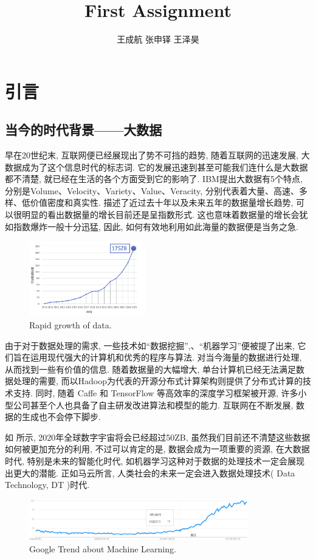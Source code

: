 \documentclass[lang=cn,11pt,a4paper]{elegantpaper}
\title{First Assignment}
\author{王成航 张申铎 王泽昊}
\begin{document}

\newpage
\tableofcontents
\thispagestyle{empty}
\newpage
{}
\section{引言}
\subsection{当今的时代背景——大数据}
\par 早在20世纪末, 互联网便已经展现出了势不可挡的趋势, 随着互联网的迅速发展, 大数据成为了这个信息时代的标志词. 它的发展迅速到甚至可能我们连什么是大数据都不清楚, 就已经在生活的各个方面受到它的影响了. IBM提出大数据有5个特点, 分别是Volume、Velocity、Variety、Value、Veracity, 分别代表着大量、高速、多样、低价值密度和真实性.  描述了近过去十年以及未来五年的数据量增长趋势, 可以很明显的看出数据量的增长目前还是呈指数形式. 这也意味着数据量的增长会犹如指数爆炸一般十分迅猛, 因此, 如何有效地利用如此海量的数据便是当务之急. 
\begin{figure}[htbp]
	\centering
	\includegraphics[width=0.45\textwidth]{Bigdata}
  	\caption{Rapid growth of data.\label{fig:data}}
\end{figure}
\par 由于对于数据处理的需求, 一些技术如“数据挖掘”,、“机器学习”便被提了出来, 它们旨在运用现代强大的计算机和优秀的程序与算法. 对当今海量的数据进行处理, 从而找到一些有价值的信息. 随着数据量的大幅增大, 单台计算机已经无法满足数据处理的需要, 而以Hadoop为代表的开源分布式计算架构则提供了分布式计算的技术支持. 同时, 随着 Caffe 和 TensorFlow 等高效率的深度学习框架被开源, 许多小型公司甚至个人也具备了自主研发改进算法和模型的能力. 互联网在不断发展, 数据的生成也不会停下脚步. 
\par 如 所示, 2020年全球数字宇宙将会已经超过50ZB, 虽然我们目前还不清楚这些数据如何被更加充分的利用, 不过可以肯定的是, 数据会成为一项重要的资源, 在大数据时代, 特别是未来的智能化时代, 如机器学习这种对于数据的处理技术一定会展现出更大的潜能. 正如马云所言, 人类社会的未来一定会进入数据处理技术( Data Technology, DT )时代.
\begin{figure}[htbp]
	\centering
	\includegraphics[width=0.85\textwidth]{GoogleTrend}
  	\caption{Google Trend about Machine Learning.\label{fig:GoogleTrend}}
\end{figure}
\end{document}
